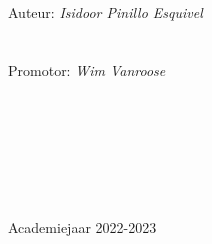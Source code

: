 \begin{titlepage}
\begin{center}
        \ \\
        \normalsize
        Auteur: {\em Isidoor Pinillo Esquivel}\\
        \ \\
        \ \\
        Promotor: {\em Wim Vanroose}\\
        \ \\
        \ \\
        \ \\
        \ \\
        \ \\
        \ \\
        \ \\
        A{\sc cademiejaar 2022-2023}

    \end{center}
\end{titlepage}


